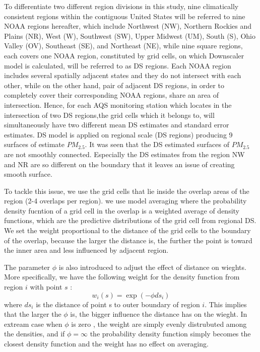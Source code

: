 


To differentiate two different region divisions in this study, nine climatically consistent regions within the contiguous United States will be referred to nine NOAA regions hereafter, which include Northwest (NW), Northern Rockies and Plains (NR), West (W), Southwest (SW), Upper Midwest (UM), South (S), Ohio Valley (OV), Southeast (SE), and Northeast (NE), while nine square regions, each covers one NOAA region, constituted by grid cells, on which Downscaler model is calculated, will be referred to as DS regions. Each NOAA region includes several spatially adjacent states and they do not intersect with each other, while on the other hand, pair of adjacent DS regions, in order to completely cover their corresponding NOAA regions, share an area of intersection. Hence, for each AQS monitoring station which locates in the intersection of two DS regions,the grid cells which it belongs to, will simultaneously have two different mean DS estimates and standard error estimates.  DS model is applied on regional scale (DS regions) producing 9 surfaces of estimate $PM_{2.5}$. It was seen that the DS estimated surfaces of $PM_{2.5}$  are not smoothly connected. Especially the DS estimates from the region NW and NR are so different on the boundary that it leaves an issue of creating smooth surface.

To tackle this issue, we use the grid cells that lie inside the overlap areas of the region (2-4 overlaps per region). we use model averaging  where the probability density fucntion of a grid cell in the overlap   is a weighted average of density functions,  which are the predictive distributions of the grid cell from regional DS. We set the weight proportional to the distance of the grid cells to the boundary of the overlap, because the larger the distance is, the further the point is toward the inner area and less influenced by adjacent region.

The parameter $\phi$ is also introduced to adjust the effect of distance on wieghts. More specifically, we have the following weight for the density function from region $i$ with point $s$ :
$$  w_{i}(s)=\exp(-\phi ds_i) $$  where $ds_i $ is the  distance of point s to outer boundary of region $i$. This implies that the larger the $\phi$ is, the bigger influence the distance has on the wieght. In extream case when $\phi$ is zero , the weight are simply evenly distrubuted among the densities, and if $\phi=\infty$  the probability density function simply becomes the closest density function and the weight has no effect on averaging.

